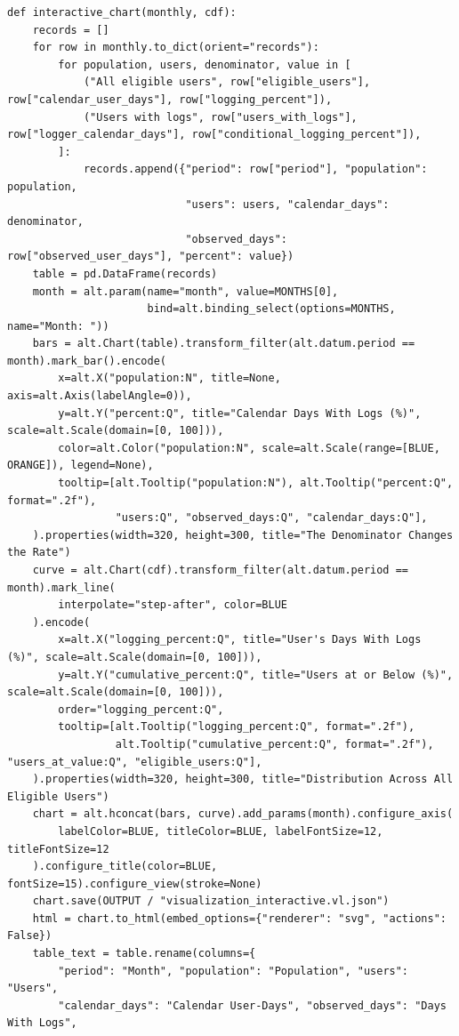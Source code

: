 \begin{Verbatim}[breaklines,breakanywhere,fontsize=\small]
def interactive_chart(monthly, cdf):
    records = []
    for row in monthly.to_dict(orient="records"):
        for population, users, denominator, value in [
            ("All eligible users", row["eligible_users"], row["calendar_user_days"], row["logging_percent"]),
            ("Users with logs", row["users_with_logs"], row["logger_calendar_days"], row["conditional_logging_percent"]),
        ]:
            records.append({"period": row["period"], "population": population,
                            "users": users, "calendar_days": denominator,
                            "observed_days": row["observed_user_days"], "percent": value})
    table = pd.DataFrame(records)
    month = alt.param(name="month", value=MONTHS[0],
                      bind=alt.binding_select(options=MONTHS, name="Month: "))
    bars = alt.Chart(table).transform_filter(alt.datum.period == month).mark_bar().encode(
        x=alt.X("population:N", title=None, axis=alt.Axis(labelAngle=0)),
        y=alt.Y("percent:Q", title="Calendar Days With Logs (%)", scale=alt.Scale(domain=[0, 100])),
        color=alt.Color("population:N", scale=alt.Scale(range=[BLUE, ORANGE]), legend=None),
        tooltip=[alt.Tooltip("population:N"), alt.Tooltip("percent:Q", format=".2f"),
                 "users:Q", "observed_days:Q", "calendar_days:Q"],
    ).properties(width=320, height=300, title="The Denominator Changes the Rate")
    curve = alt.Chart(cdf).transform_filter(alt.datum.period == month).mark_line(
        interpolate="step-after", color=BLUE
    ).encode(
        x=alt.X("logging_percent:Q", title="User's Days With Logs (%)", scale=alt.Scale(domain=[0, 100])),
        y=alt.Y("cumulative_percent:Q", title="Users at or Below (%)", scale=alt.Scale(domain=[0, 100])),
        order="logging_percent:Q",
        tooltip=[alt.Tooltip("logging_percent:Q", format=".2f"),
                 alt.Tooltip("cumulative_percent:Q", format=".2f"), "users_at_value:Q", "eligible_users:Q"],
    ).properties(width=320, height=300, title="Distribution Across All Eligible Users")
    chart = alt.hconcat(bars, curve).add_params(month).configure_axis(
        labelColor=BLUE, titleColor=BLUE, labelFontSize=12, titleFontSize=12
    ).configure_title(color=BLUE, fontSize=15).configure_view(stroke=None)
    chart.save(OUTPUT / "visualization_interactive.vl.json")
    html = chart.to_html(embed_options={"renderer": "svg", "actions": False})
    table_text = table.rename(columns={
        "period": "Month", "population": "Population", "users": "Users",
        "calendar_days": "Calendar User-Days", "observed_days": "Days With Logs",

\end{Verbatim}

